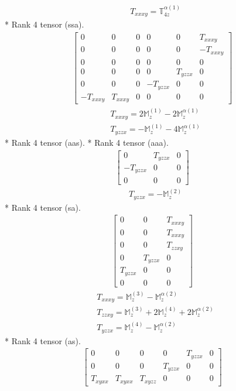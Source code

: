 \documentclass[fleqn,8pt,landscape]{jsarticle}
\begin{document}
\begin{align*}
& T_{xxxy} = \mathbb{T}_{4z}^{\alpha(1)}
\end{align*}
* Rank 4 tensor (ssa).
\begin{align*}
\begin{bmatrix} 0 & 0 & 0 & 0 & 0 & T_{xxxy} \\ 0 & 0 & 0 & 0 & 0 & - T_{xxxy} \\ 0 & 0 & 0 & 0 & 0 & 0 \\ 0 & 0 & 0 & 0 & T_{yzzx} & 0 \\ 0 & 0 & 0 & - T_{yzzx} & 0 & 0 \\ - T_{xxxy} & T_{xxxy} & 0 & 0 & 0 & 0 \end{bmatrix}
\end{align*}
\begin{align*}
& T_{xxxy} = 2 \mathbb{M}_{z}^{(1)} - 2 \mathbb{M}_{z}^{\alpha(1)} \\
& T_{yzzx} = - \mathbb{M}_{z}^{(1)} - 4 \mathbb{M}_{z}^{\alpha(1)}
\end{align*}
* Rank 4 tensor (aas).
* Rank 4 tensor (aaa).
\begin{align*}
\begin{bmatrix} 0 & T_{yzzx} & 0 \\ - T_{yzzx} & 0 & 0 \\ 0 & 0 & 0 \end{bmatrix}
\end{align*}
\begin{align*}
& T_{yzzx} = - \mathbb{M}_{z}^{(2)}
\end{align*}
* Rank 4 tensor (sa).
\begin{align*}
\begin{bmatrix} 0 & 0 & T_{xxxy} \\ 0 & 0 & T_{xxxy} \\ 0 & 0 & T_{zzxy} \\ 0 & T_{yzzx} & 0 \\ T_{yzzx} & 0 & 0 \\ 0 & 0 & 0 \end{bmatrix}
\end{align*}
\begin{align*}
& T_{xxxy} = \mathbb{M}_{z}^{(3)} - \mathbb{M}_{z}^{\alpha(2)} \\
& T_{zzxy} = \mathbb{M}_{z}^{(3)} + 2 \mathbb{M}_{z}^{(4)} + 2 \mathbb{M}_{z}^{\alpha(2)} \\
& T_{yzzx} = \mathbb{M}_{z}^{(4)} - \mathbb{M}_{z}^{\alpha(2)}
\end{align*}
* Rank 4 tensor (as).
\begin{align*}
\begin{bmatrix} 0 & 0 & 0 & 0 & T_{yzzx} & 0 \\ 0 & 0 & 0 & T_{yzzx} & 0 & 0 \\ T_{xyxx} & T_{xyxx} & T_{xyzz} & 0 & 0 & 0 \end{bmatrix}
\end{align*}
\end{document}
